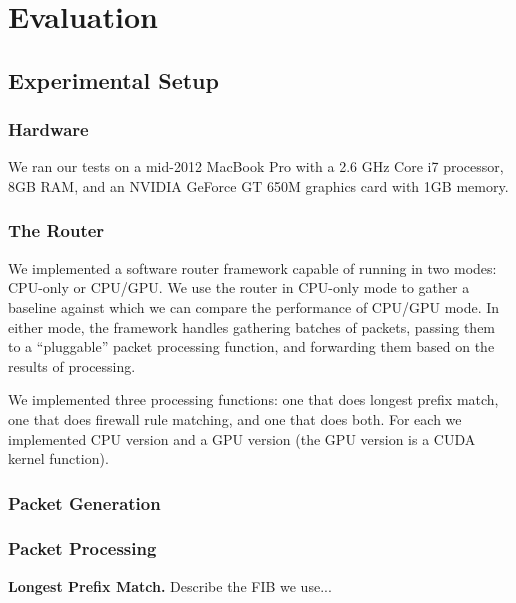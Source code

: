 \section{Evaluation}
\label{sec:eval}

\subsection{Experimental Setup}

\subsubsection{Hardware}

We ran our tests on a mid-2012 MacBook Pro with a 2.6 GHz Core i7 processor,
8GB RAM, and an NVIDIA GeForce GT 650M graphics card with 1GB memory.


\subsubsection{The Router}

We implemented a software router framework capable of running in two modes:
CPU-only or CPU/GPU. We use the router in CPU-only mode to gather a baseline
against which we can compare the performance of CPU/GPU mode. In either mode,
the framework handles gathering batches of packets, passing them to a
``pluggable'' packet processing function, and forwarding them based on the
results of processing. 

We implemented three processing functions: one that does longest prefix match,
one that does firewall rule matching, and one that does both. For each we
implemented CPU version and a GPU version (the GPU version is a CUDA kernel
function). 

\subsubsection{Packet Generation}

\subsubsection{Packet Processing}
\label{sec:eval-proc}

\noindent \textbf{Longest Prefix Match.} Describe the FIB we use...\\

